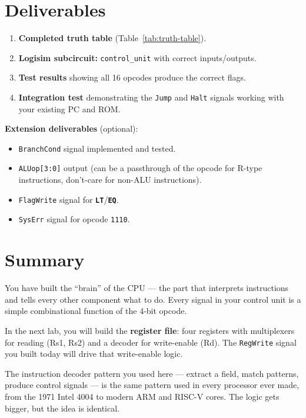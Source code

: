\documentclass[11pt,a4paper]{article}
\newcommand{\opcode}[1]{\texttt{#1}}
\newcommand{\instr}[1]{\texttt{\textbf{#1}}}
\newcommand{\flag}[1]{\texttt{#1}}
\begin{document}
\section{Deliverables}

\begin{enumerate}[leftmargin=2em]
  \item \textbf{Completed truth table} (Table~\ref{tab:truth-table}).
  \item \textbf{Logisim subcircuit:} \texttt{control\_unit} with correct inputs/outputs.
  \item \textbf{Test results} showing all 16 opcodes produce the correct flags.
  \item \textbf{Integration test} demonstrating the \flag{Jump} and \flag{Halt} signals working with your existing PC and ROM.
\end{enumerate}

\medskip
\noindent \textbf{Extension deliverables} (optional):
\begin{itemize}[leftmargin=2em]
  \item \flag{BranchCond} signal implemented and tested.
  \item \flag{ALUop[3:0]} output (can be a passthrough of the opcode for R-type instructions, don't-care for non-ALU instructions).
  \item \flag{FlagWrite} signal for \instr{LT}/\instr{EQ}.
  \item \flag{SysErr} signal for opcode \opcode{1110}.
\end{itemize}


\section{Summary}

You have built the ``brain'' of the CPU --- the part that interprets instructions and tells every other component what to do. Every signal in your control unit is a simple combinational function of the 4-bit opcode.

\medskip
\noindent In the next lab, you will build the \textbf{register file}: four registers with multiplexers for reading (Rs1, Rs2) and a decoder for write-enable (Rd). The \flag{RegWrite} signal you built today will drive that write-enable logic.

\begin{designnote}
The instruction decoder pattern you used here --- extract a field, match patterns, produce control signals --- is the same pattern used in every processor ever made, from the 1971 Intel 4004 to modern ARM and RISC-V cores. The logic gets bigger, but the idea is identical.
\end{designnote}
\end{document}
